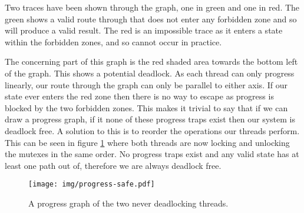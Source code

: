Two traces have been shown through the graph, one in green and one in red. The green shows a valid route through that does not enter any forbidden zone and so will produce a valid result. The red is an impossible trace as it enters a state within the forbidden zones, and so cannot occur in practice.

The concerning part of this graph is the red shaded area towards the bottom left of the graph. This shows a potential deadlock. As each thread can only progress linearly, our route through the graph can only be parallel to either axis. If our state ever enters the red zone then there is no way to escape as progress is blocked by the two forbidden zones. This makes it trivial to say that if we can draw a progress graph, if it none of these progress traps exist then our system is deadlock free. A solution to this is to reorder the operations our threads perform. This can be seen in figure \ref{fig:progress-safe} where both threads are now locking and unlocking the mutexes in the same order. No progress traps exist and any valid state has at least one path out of, therefore we are always deadlock free.

\begin{figure}
  \centering
  \texttt{[image: img/progress-safe.pdf]}
  \caption{A progress graph of the two never deadlocking threads.}
  \label{fig:progress-safe}
\end{figure}

